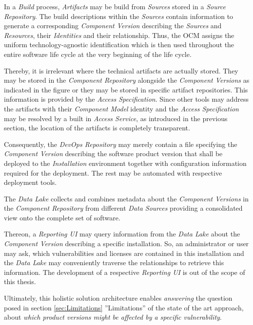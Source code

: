 In a \emph{Build} process, \emph{Artifacts} may be build from \emph{Sources} stored in a \emph{Source Repository}. The build descriptions within the \emph{Sources} contain information to generate a corresponding \emph{Component Version} describing the \emph{Sources} and \emph{Resources}, their \emph{Identities} and their relationship. Thus, the OCM assigns the uniform technology-agnostic identification which is then used throughout the entire software life cycle at the very beginning of the life cycle.\par
Thereby, it is irrelevant where the technical artifacts are actually stored. They may be stored in the \emph{Component Repository} alongside the \emph{Component Versions} as indicated in the figure or they may be stored in specific artifact repositories. This information is provided by the \emph{Access Specification}. Since other tools may address the artifacts with their \emph{Component Model} identity and the \emph{Access Specification} may be resolved by a built in \emph{Access Service}, as introduced in the previous section, the location of the artifacts is completely transparent.\par
Consequently, the \emph{DevOps Repository} may merely contain a file specifying the \emph{Component Version} describing the software product version that shall be deployed to the \emph{Installation} environment together with configuration information required for the deployment. The rest may be automated with respective deployment tools.\par
The \emph{Data Lake} collects and combines metadata about the \emph{Component Versions} in the \emph{Component Repository} from different \emph{Data Sources} providing a consolidated view onto the complete set of software.\par
Thereon, a \emph{Reporting UI} may query information from the \emph{Data Lake} about the \emph{Component Version} describing a specific installation. So, an administrator or user may ask, which vulnerabilities and licenses are contained in this installation and the \emph{Data Lake} may conveniently traverse the relationships to retrieve this information. The development of a respective \emph{Reporting UI} is out of the scope of this thesis.\par
Ultimately, this holistic solution architecture enables \emph{answering} the question posed in section \ref{sec:Limitations} ''Limitations'' of the state of the art approach, about \emph{which product versions might be affected by a specific vulnerability}.